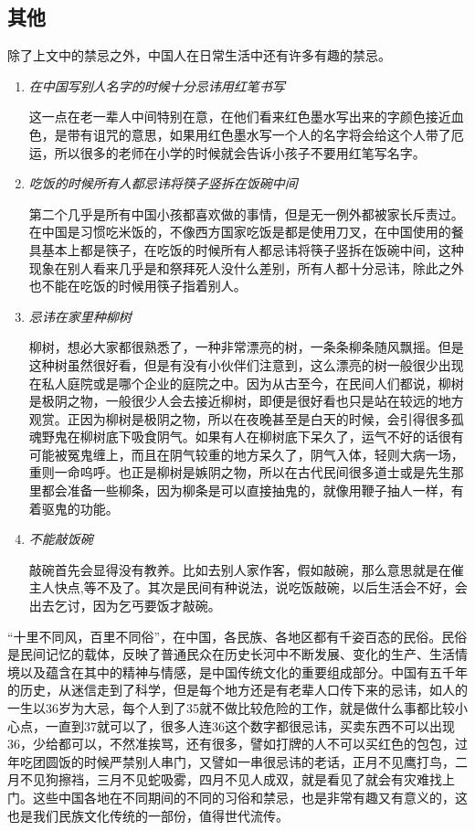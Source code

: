 \subsection{其他}

    除了上文中的禁忌之外，中国人在日常生活中还有许多有趣的禁忌。
    \begin{enumerate}
    \item
    \emph{在中国写别人名字的时候十分忌讳用红笔书写}

   这一点在老一辈人中间特别在意，在他们看来红色墨水写出来的字颜色接近血色，是带有诅咒的意思，如果用红色墨水写一个人的名字将会给这个人带了厄运，所以很多的老师在小学的时候就会告诉小孩子不要用红笔写名字。

   \item
   \emph{吃饭的时候所有人都忌讳将筷子竖拆在饭碗中间}

   第二个几乎是所有中国小孩都喜欢做的事情，但是无一例外都被家长斥责过。在中国是习惯吃米饭的，不像西方国家吃饭是都是使用刀叉，在中国使用的餐具基本上都是筷子，在吃饭的时候所有人都忌讳将筷子竖拆在饭碗中间，这种现象在别人看来几乎是和祭拜死人没什么差别，所有人都十分忌讳，除此之外也不能在吃饭的时候用筷子指着别人。

   \item
   \emph{忌讳在家里种柳树}

   柳树，想必大家都很熟悉了，一种非常漂亮的树，一条条柳条随风飘摇。但是这种树虽然很好看，但是有没有小伙伴们注意到，这么漂亮的树一般很少出现在私人庭院或是哪个企业的庭院之中。因为从古至今，在民间人们都说，柳树是极阴之物，一般很少人会去接近柳树，即便是很好看也只是站在较远的地方观赏。正因为柳树是极阴之物，所以在夜晚甚至是白天的时候，会引得很多孤魂野鬼在柳树底下吸食阴气。如果有人在柳树底下呆久了，运气不好的话很有可能被冤鬼缠上，而且在阴气较重的地方呆久了，阴气入体，轻则大病一场，重则一命呜呼。也正是柳树是嫉阴之物，所以在古代民间很多道士或是先生那里都会准备一些柳条，因为柳条是可以直接抽鬼的，就像用鞭子抽人一样，有着驱鬼的功能。

   \item
   \emph{不能敲饭碗}

   敲碗首先会显得没有教养。比如去别人家作客，假如敲碗，那么意思就是在催主人快点,等不及了。其次是民间有种说法，说吃饭敲碗，以后生活会不好，会出去乞讨，因为乞丐要饭才敲碗。
        
    \end{enumerate}



   “十里不同风，百里不同俗”，在中国，各民族、各地区都有千姿百态的民俗。民俗是民间记忆的载体，反映了普通民众在历史长河中不断发展、变化的生产、生活情境以及蕴含在其中的精神与情感，是中国传统文化的重要组成部分。中国有五千年的历史，从迷信走到了科学，但是每个地方还是有老辈人口传下来的忌讳，如人的一生以36岁为大忌，每个人到了35就不做比较危险的工作，就是做什么事都比较小心点，一直到37就可以了，很多人连36这个数字都很忌讳，买卖东西不可以出现36，少给都可以，不然准挨骂，还有很多，譬如打牌的人不可以买红色的包包，过年吃团圆饭的时候严禁别人串门，又譬如一串很忌讳的老话，正月不见鹰打鸟，二月不见狗擦裆，三月不见蛇吸雾，四月不见人成双，就是看见了就会有灾难找上门。这些中国各地在不同期间的不同的习俗和禁忌，也是非常有趣又有意义的，这也是我们民族文化传统的一部份，值得世代流传。
